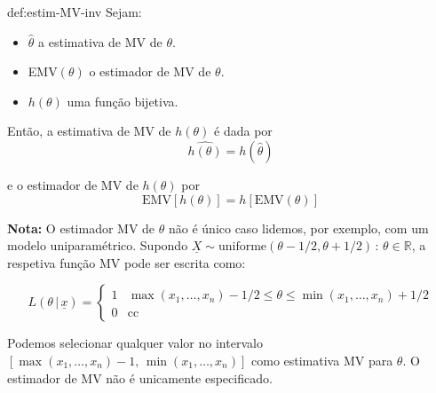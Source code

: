 \vspace{-1 em}
\begin{theo}{def:estim-MV-inv}\label{def:estim-MV-inv}
    \noindent Sejam:
    \begin{itemize}
        \item $\hat{\theta}$ a estimativa de MV de $\theta$.
        \item EMV$(\theta)$ o estimador de MV de $\theta$.
        \item $h(\theta)$ uma função bijetiva.
    \end{itemize}

    \noindent Então, a estimativa de MV de $h(\theta)$ é dada por
    $$
        \widehat{h(\theta)} = h(\hat{\theta})
    $$

    \noindent e o estimador de MV de $h(\theta)$ por
    $$
        \text{EMV}[h(\theta)] = h[\text{EMV}(\theta)]
    $$
\end{theo}

\noindent\textbf{Nota:} O estimador MV de $\theta$ não é único caso lidemos, por exemplo, com um modelo uniparamétrico. Supondo $\underline{X} \sim \text{uniforme}(\theta - 1/2, \theta + 1/2)\,:\, \theta \in \mathbb{R}$, a respetiva função MV pode ser escrita como:

$$
    L(\theta\, |\, \underline{x}) = \left\{\begin{array}{ll}
          1 & \max(x_1, \dots, x_n) - 1/2 \leq \theta \leq \min(x_1, \dots, x_n) + 1/2\\
         0 & \text{cc}
    \end{array}
    \right.
$$

\noindent Podemos selecionar qualquer valor no intervalo $[\max(x_1,\dots, x_n) - 1,\, \min(x_1,\dots,x_n)]$ como estimativa MV para $\theta$. O estimador de MV não é unicamente especificado.
